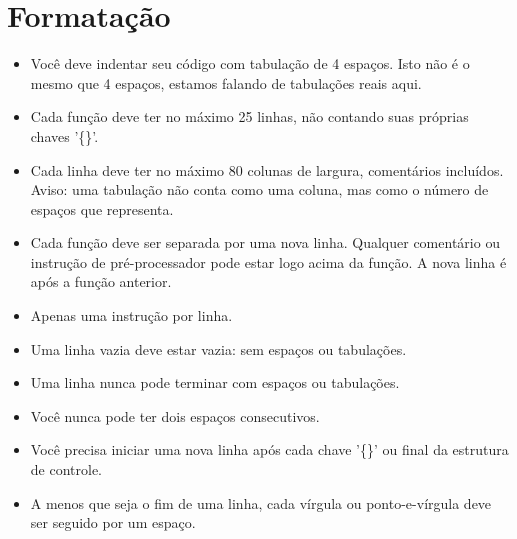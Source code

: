 \documentclass{42-pt}
\begin{document}
    \section{Formatação}

            \begin{itemize}

                \item Você deve indentar seu código com tabulação de 4 espaços.
                  Isto não é o mesmo que 4
                  espaços, estamos falando de tabulações reais aqui.

                \item Cada função deve ter no máximo 25 linhas, não
                  contando suas próprias chaves '\{\}'.

                \item Cada linha deve ter no máximo 80 colunas de largura,
                  comentários incluídos. Aviso: uma tabulação não conta
                  como uma coluna, mas como o número de espaços que
                  representa.

                \item Cada função deve ser separada por uma nova linha. Qualquer
                  comentário ou instrução de pré-processador
                  pode estar logo acima da função. A nova linha é após a função anterior.

                \item Apenas uma instrução por linha.

                \item Uma linha vazia deve estar vazia: sem espaços ou tabulações.

                \item Uma linha nunca pode terminar com espaços ou tabulações.

                \item Você nunca pode ter dois espaços consecutivos.

                \item Você precisa iniciar uma nova linha após cada chave '\{\}'
                  ou final da estrutura de controle.

                \item A menos que seja o fim de uma linha, cada vírgula ou ponto-e-vírgula
                  deve ser seguido por um espaço.


\end{itemize}
\end{document}
